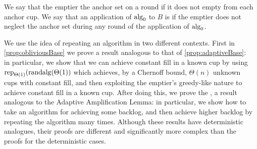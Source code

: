 \begin{definition}
{\normalfont
We say that the emptier  the anchor set on a round
if it does not empty from each anchor cup. We say that an
application of $\operatorname{\text{\textup{alg}}}_0$ to $B$ is  if
the emptier does not neglect the anchor set during any round of
the application of $\operatorname{\text{\textup{alg}}}_0$.
}
\end{definition}

We use the idea of repeating an algorithm in two different contexts.
First in \cref{prop:obliviousBase} we prove a result analogous to that of
\cref{prop:adaptiveBase}: in particular, we show that we can
achieve constant fill in a known cup by using
$\operatorname{\text{\textup{rep}}}_{\Theta(1)}(\operatorname{\text{\textup{randalg}}}(\Theta(1))$
which achieves, by a Chernoff bound, $\Theta(n)$ unknown cups
with constant fill, and then exploiting the emptier's greedy-like
nature to achieve constant fill in a known cup.
After doing this, we prove the , a result analogous to the Adaptive
Amplification Lemma: in particular, we show how to take an
algorithm for achieving some backlog, and then achieve higher
backlog by repeating the algorithm many times.
Although these results have deterministic analogues, their proofs
are different and significantly more complex than the proofs for the
deterministic cases.

